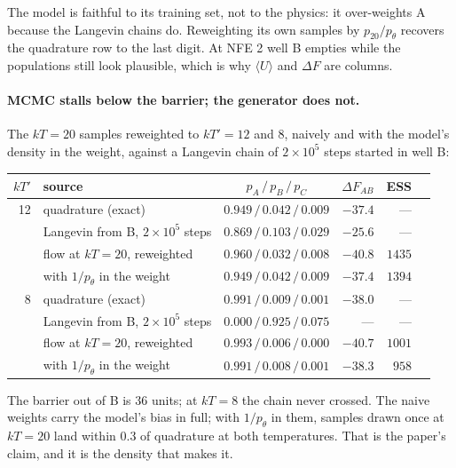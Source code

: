 \noindent The model is faithful to its training set, not to the physics: it
over-weights A because the Langevin chains do. Reweighting its own samples by
$p_{20} / p_\theta$ recovers the quadrature row to the last digit. At NFE 2
well B empties while the populations still look plausible, which is why
$\langle U \rangle$ and $\Delta F$ are columns.

\paragraph{MCMC stalls below the barrier; the generator does not.} The
$kT = 20$ samples reweighted to $kT' = 12$ and $8$, naively and with the
model's density in the weight, against a Langevin chain of $2 \times 10^5$
steps started in well B:

\begin{center}
\small
\begin{tabular}{@{}r l c r r r@{}}
\hline
$kT'$ & source & $p_A \,/\, p_B \,/\, p_C$ & $\Delta F_{AB}$ & ESS \\
\hline
12 & quadrature (exact)                        & $0.949 \,/\, 0.042 \,/\, 0.009$ & $-37.4$ & --- \\
   & Langevin from B, $2 \times 10^5$ steps    & $0.869 \,/\, 0.103 \,/\, 0.029$ & $-25.6$ & --- \\
   & flow at $kT = 20$, reweighted             & $0.960 \,/\, 0.032 \,/\, 0.008$ & $-40.8$ & $1435$ \\
   & \quad with $1/p_\theta$ in the weight     & $0.949 \,/\, 0.042 \,/\, 0.009$ & $\mathbf{-37.4}$ & $1394$ \\
8  & quadrature (exact)                        & $0.991 \,/\, 0.009 \,/\, 0.001$ & $-38.0$ & --- \\
   & Langevin from B, $2 \times 10^5$ steps    & $0.000 \,/\, 0.925 \,/\, 0.075$ & ---     & --- \\
   & flow at $kT = 20$, reweighted             & $0.993 \,/\, 0.006 \,/\, 0.000$ & $-40.7$ & $1001$ \\
   & \quad with $1/p_\theta$ in the weight     & $0.991 \,/\, 0.008 \,/\, 0.001$ & $\mathbf{-38.3}$ & $958$ \\
\hline
\end{tabular}
\end{center}

\noindent The barrier out of B is 36 units; at $kT = 8$ the chain never
crossed. The naive weights carry the model's bias in full; with $1/p_\theta$
in them, samples drawn once at $kT = 20$ land within 0.3 of quadrature at both
temperatures. That is the paper's claim, and it is the density that makes it.

